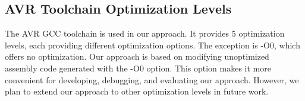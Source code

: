 \subsection{AVR Toolchain Optimization Levels}

The AVR GCC toolchain is used in our approach. It provides 5 optimization levels, each providing different optimization options. The exception is -O0, which offers no optimization\cite{hoste2008cole}. Our approach is based on modifying unoptimized assembly code generated with the -O0 option. This option makes it more convenient for developing, debugging, and evaluating our approach. However, we plan to extend our approach to other optimization levels in future work.

